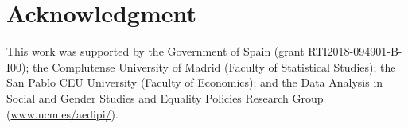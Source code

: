 
\section{Acknowledgment}

This work was supported by the Government of Spain (grant RTI2018-094901-B-I00); the Complutense University of Madrid (Faculty of Statistical Studies); the San Pablo CEU University (Faculty of Economics); and the Data Analysis in Social and Gender Studies and Equality Policies Research Group (\url{www.ucm.es/aedipi/}). 




\address{Julio E. Sandubete\\
  Faculty of Statistical Studies\\
  Complutense University of Madrid\\
  28040 Madrid, Spain\\
  ORCiD: 0000-0002-1518-0417\\
  E-mail:}  \\

\address{Lorenzo Escot\\
  Faculty of Statistical Studies\\
  Complutense University of Madrid\\
  28040 Madrid, Spain\\
  ORCiD: 0000-0002-6734-6327\\
E-mail:} 

